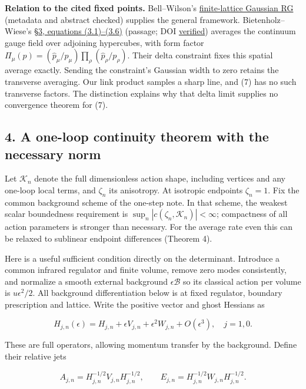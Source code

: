 \documentclass[11pt,a4paper]{article}
\begin{document}
\textbf{Relation to the cited fixed points.} Bell--Wilson's
\href{https://doi.org/10.1103/PhysRevB.11.3431}{finite-lattice Gaussian
RG} (metadata and abstract checked) supplies the general framework.
Bietenholz--Wiese's \href{https://arxiv.org/pdf/hep-lat/9510026}{§3,
equations (3.1)--(3.6)} (passage; DOI
\href{https://doi.org/10.1016/0550-3213(95)00678-8}{verified}) averages
the continuum gauge field over adjoining hypercubes, with form factor
\(\Pi_\mu(p)=(\widehat p_\mu/p_\mu)\prod_\rho (\widehat p_\rho/p_\rho)\).
Their delta constraint fixes this spatial average exactly. Sending the
constraint's Gaussian width to zero retains the transverse averaging.
Our link product samples a sharp line, and (7) has no such transverse
factors. The distinction explains why that delta limit supplies no
convergence theorem for (7).

\hypertarget{a-one-loop-continuity-theorem-with-the-necessary-norm}{%
\subsection{4. A one-loop continuity theorem with the necessary
norm}\label{a-one-loop-continuity-theorem-with-the-necessary-norm}}

Let \(\mathcal K_n\) denote the full dimensionless action shape,
including vertices and any one-loop local terms, and \(\zeta_n\) its
anisotropy. At isotropic endpoints \(\zeta_n=1\). Fix the common
background scheme of the one-step note. In that scheme, the weakest
scalar boundedness requirement is
\(\sup_n|c(\zeta_n,\mathcal K_n)|<\infty\); compactness of all action
parameters is stronger than necessary. For the average rate even this
can be relaxed to sublinear endpoint differences (Theorem 4).

Here is a useful sufficient condition directly on the determinant.
Introduce a common infrared regulator and finite volume, remove zero
modes consistently, and normalize a smooth external background
\(\epsilon\mathcal B\) so its classical action per volume is
\(u\epsilon^2/2\). All background differentiation below is at fixed
regulator, boundary prescription and lattice. Write the positive vector
and ghost Hessians as

\[H_{j,n}(\epsilon)=H_{j,n}+\epsilon V_{j,n}
                  +\epsilon^2 W_{j,n}+O(\epsilon^3),\quad j=1,0.\]

These are full operators, allowing momentum transfer by the background.
Define their relative jets

\[A_{j,n}=H_{j,n}^{-1/2}V_{j,n}H_{j,n}^{-1/2},\qquad
 E_{j,n}=H_{j,n}^{-1/2}W_{j,n}H_{j,n}^{-1/2}. \tag{9}\]
\end{document}
